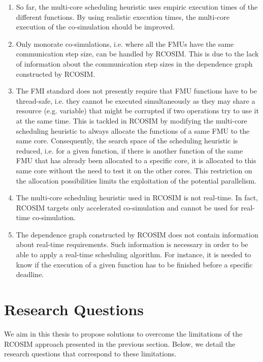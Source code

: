 \begin{enumerate}

\item So far, the multi-core scheduling heuristic uses empiric execution times of the different functions. By using realistic execution times, the multi-core execution of the co-simulation should be improved.

\item Only monorate co-simulations, i.e. where all the FMUs have the same communication step size, can be handled by RCOSIM. This is due to the lack of information about the communication step sizes in the dependence graph constructed by RCOSIM.

\item The FMI standard does not presently require that FMU functions have to be thread-safe, i.e. they cannot be executed simultaneously as they may share a resource (e.g. variable) that might be corrupted if two operations try to use it at the same time. This is tackled in RCOSIM by modifying the multi-core scheduling heuristic to always allocate the functions of a same FMU to the same core. Consequently, the search space of the scheduling heuristic is reduced, i.e. for a given function, if there is another function of the same FMU that has already been allocated to a specific core, it is allocated to this same core without the need to test it on the other cores. This restriction on the allocation possibilities limits the exploitation of the potential parallelism.

\item The multi-core scheduling heuristic used in RCOSIM is not real-time. In fact, RCOSIM targets only accelerated co-simulation and cannot be used for real-time co-simulation.

\item The dependence graph constructed by RCOSIM does not contain information about real-time requirements. Such information is necessary in order to be able to apply a real-time scheduling algorithm. For instance, it is needed to know if the execution of a given function has to be finished before a specific deadline.

\end{enumerate} 

\section{Research Questions}

We aim in this thesis to propose solutions to overcome the limitations of the RCOSIM approach presented in the previous section. Below, we detail the research questions that correspond to these limitations.

